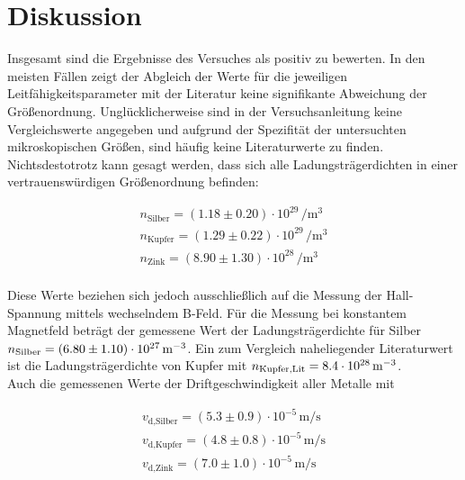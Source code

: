 %

%
\section{Diskussion}
\label{sec:Diskussion}

Insgesamt sind die Ergebnisse des Versuches als positiv zu bewerten. In den meisten Fällen zeigt der Abgleich der 
Werte für die jeweiligen Leitfähigkeitsparameter mit der Literatur keine signifikante Abweichung der Größenordnung.
Unglücklicherweise sind in der Versuchsanleitung keine Vergleichswerte angegeben und aufgrund der Spezifität der 
untersuchten mikroskopischen Größen, sind häufig keine Literaturwerte zu finden.\\

\noindent Nichtsdestotrotz kann gesagt werden, dass sich alle Ladungsträgerdichten in einer vertrauenswürdigen Größenordnung befinden:

\begin{align*}
    n_\text{Silber} = \left(1.18 \pm 0.20\right)\cdot{}10^{29}\,\unit{\per\cubic\meter}\\
    n_\text{Kupfer} = \left(1.29 \pm 0.22\right)\cdot{}10^{29}\,\unit{\per\cubic\meter}\\
    n_\text{Zink} = \left(8.90 \pm 1.30\right)\cdot{}10^{28}\,\unit{\per\cubic\meter}\\
\end{align*}

\noindent Diese Werte beziehen sich jedoch ausschließlich auf die Messung der Hall-Spannung mittels wechselndem B-Feld.
Für die Messung bei konstantem Magnetfeld beträgt der gemessene Wert der Ladungsträgerdichte für Silber 
$n_\text{Silber} = \left(6.80 \pm 1.10\right)\cdot{}10^{27}\,\unit[per-mode=reciprocal]{\per\cubic\meter}$. Ein zum Vergleich naheliegender
Literaturwert ist die Ladungsträgerdichte von Kupfer mit $n_\text{Kupfer,Lit} = 8.4\cdot{}10^{28}\,\unit[per-mode=reciprocal]{
\per\cubic\meter}$\cite{leitfaehigkeiten}.\\

\noindent Auch die gemessenen Werte der Driftgeschwindigkeit aller Metalle mit 

\begin{align*}
    v_\text{d,Silber} = \left(5.3 \pm 0.9\right)\cdot{}10^{-5}\,\unit{\meter\per\second}\\
    v_\text{d,Kupfer} = \left(4.8 \pm 0.8\right)\cdot{}10^{-5}\,\unit{\meter\per\second}\\
    v_\text{d,Zink} = \left(7.0 \pm 1.0\right)\cdot{}10^{-5}\,\unit{\meter\per\second}\\
\end{align*}


